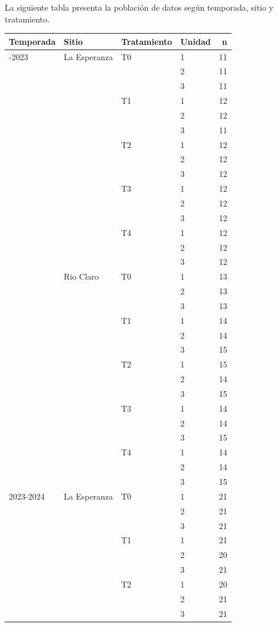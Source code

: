 \documentclass[
  letterpaper,
  DIV=11,
  numbers=noendperiod]{scrreprt}
\begin{document}
La siguiente tabla presenta la población de datos según temporada, sitio
y tratamiento.

\begin{longtable}[]{@{}llllr@{}}
\toprule\noalign{}
Temporada & Sitio & Tratamiento & Unidad & n \\
\midrule\noalign{}
\endhead
\bottomrule\noalign{}
\endlastfoot
2022-2023 & La Esperanza & T0 & 1 & 11 \\
& & & 2 & 11 \\
& & & 3 & 11 \\
& & T1 & 1 & 12 \\
& & & 2 & 12 \\
& & & 3 & 11 \\
& & T2 & 1 & 12 \\
& & & 2 & 12 \\
& & & 3 & 12 \\
& & T3 & 1 & 12 \\
& & & 2 & 12 \\
& & & 3 & 12 \\
& & T4 & 1 & 12 \\
& & & 2 & 12 \\
& & & 3 & 12 \\
& Rio Claro & T0 & 1 & 13 \\
& & & 2 & 13 \\
& & & 3 & 13 \\
& & T1 & 1 & 14 \\
& & & 2 & 14 \\
& & & 3 & 15 \\
& & T2 & 1 & 15 \\
& & & 2 & 14 \\
& & & 3 & 15 \\
& & T3 & 1 & 14 \\
& & & 2 & 14 \\
& & & 3 & 15 \\
& & T4 & 1 & 14 \\
& & & 2 & 14 \\
& & & 3 & 15 \\
2023-2024 & La Esperanza & T0 & 1 & 21 \\
& & & 2 & 21 \\
& & & 3 & 21 \\
& & T1 & 1 & 21 \\
& & & 2 & 20 \\
& & & 3 & 21 \\
& & T2 & 1 & 20 \\
& & & 2 & 21 \\
& & & 3 & 21 \\

\end{longtable}
\end{document}
